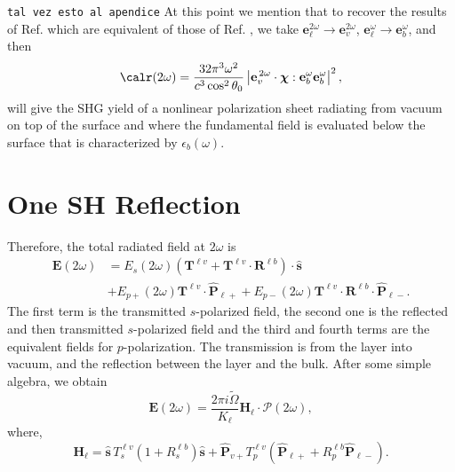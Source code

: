 \verb=tal vez esto al apendice=
At this point we mention that to recover the results of Ref.
\cite{mizrahiJOSA88} which are equivalent of those of Ref. \cite{sipePRB87}, we
take $\mathbf{e}^{2\omega}_{\ell}\to \mathbf{e}^{2\omega}_v$,
$\mathbf{e}^{\omega}_{\ell}\to \mathbf{e}^{\omega}_{b}$, 
and then
\begin{equation}\label{m69}
\calr(2\omega) =
\frac{32\pi^{3} \omega^{2}}{c^{3}\cos^{2}\theta_0}
\left\vert
\mathbf{e}^{\,2\omega}_{v}\cdot\boldsymbol{\chi}:
\mathbf{e}^{\omega}_{b}\mathbf{e}^{\omega}_{b}
\right\vert^{2} 
,
\end{equation}
will give the SHG yield of a nonlinear polarization sheet radiating from vacuum
on top of the surface and where the fundamental field is evaluated below the
surface that is characterized by $\epsilon_{b}(\omega)$.


\section{One SH Reflection}
Therefore, the total radiated field at 
$2\omega$ is 
\begin{equation}\label{r7}
\begin{split}
\mathbf{E}(2\omega)  
&= E_s(2\omega)  
\left(
\mathbf{T}^{\ell v} + \mathbf{T}^{\ell v}\cdot\mathbf{R}^{\ell b}
\right)  
\cdot\hat{\mathbf{s}}\nonumber\\
&+ E_{p+}(2\omega)\mathbf{T}^{\ell v}\cdot\hat{\mathbf{P}}_{\ell +}
 + E_{p-}(2\omega)\mathbf{T}^{\ell v}
\cdot\mathbf{R}^{\ell b}\cdot\hat{\mathbf{P}}_{\ell-}.  
\end{split}
\end{equation} 
The first term is  the transmitted $s$-polarized field, the second one is the 
reflected and then transmitted $s$-polarized field and the third and fourth 
terms are the equivalent fields for $p$-polarization. The transmission is from 
the layer into vacuum, and the reflection between the layer and the bulk. After 
some simple algebra, we obtain 
\begin{equation}\label{r8}
\mathbf{E}(2\omega) = \frac{2\pi i\tilde{\Omega}}{K_{\ell}}
\mathbf{H}_{\ell}\cdot\boldsymbol{\mathcal{P}}(2\omega),
\end{equation} 
where,
\begin{equation}\label{r9}
\mathbf{H}_{\ell}
= \hat{\mathbf{s}}\,T_s^{\ell v}\left(1+R_s^{\ell b}\right)\hat{\mathbf{s}}
+ \hat{\mathbf{P}}_{v+}T_{p}^{\ell v}
\left(
\hat{\mathbf{P}}_{\ell +} +R_{p}^{\ell b}\hat{\mathbf{P}}_{\ell -}
\right). 
\end{equation}

